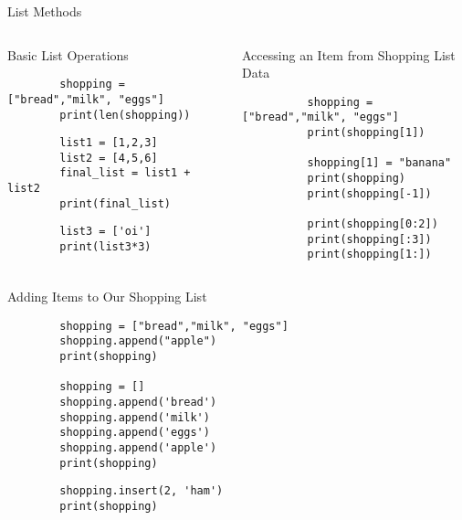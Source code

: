 \documentclass[../main.tex]{subfiles}
\begin{document}
\begin{frame}[fragile]{List Methods}
    \begin{columns}[t]
        \begin{exercise}{Basic List Operations}
      \begin{lstlisting}
        shopping = ["bread","milk", "eggs"]
        print(len(shopping))
      \end{lstlisting}
      \begin{lstlisting}
        list1 = [1,2,3]
        list2 = [4,5,6]
        final_list = list1 + list2
        print(final_list)
      \end{lstlisting}
   
      \begin{lstlisting}
        list3 = ['oi']
        print(list3*3)
      \end{lstlisting}
    \end{exercise}
      \begin{exercise}{Accessing an Item from Shopping List Data}
        \begin{lstlisting}
          shopping = ["bread","milk", "eggs"]
          print(shopping[1])

          shopping[1] = "banana"
          print(shopping)
          print(shopping[-1])

          print(shopping[0:2])
          print(shopping[:3])
          print(shopping[1:])
        \end{lstlisting}
      \end{exercise}
    \end{columns}

  \end{frame}

  \begin{frame}[fragile]{}
    \begin{exercise}{Adding Items to Our Shopping List}
      \begin{lstlisting}
        shopping = ["bread","milk", "eggs"]
        shopping.append("apple")
        print(shopping)

        shopping = []
        shopping.append('bread')
        shopping.append('milk')
        shopping.append('eggs')
        shopping.append('apple')
        print(shopping)
      \end{lstlisting}
      \begin{lstlisting}
        shopping.insert(2, 'ham')
        print(shopping)
      \end{lstlisting}
    \end{exercise}
  \end{frame}
\end{document}
